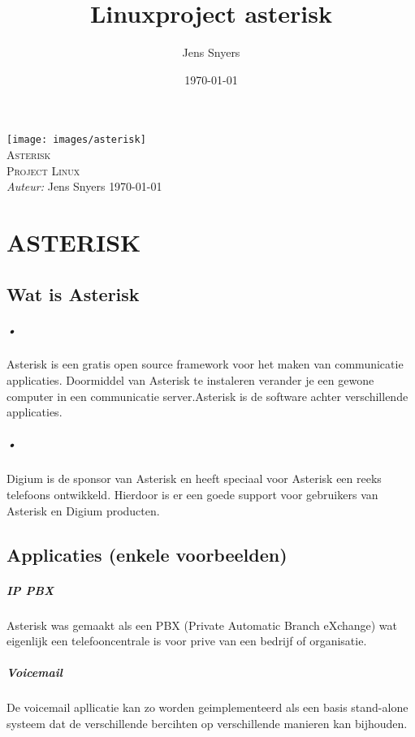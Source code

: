 \documentclass[12pt,a4paper]{report}
\title{Linuxproject asterisk}
\author{Jens Snyers}
\date{\today}
\begin{document}
\begin{titlepage}
\begin{center}
\texttt{[image: images/asterisk]} \\
\textsc{\LARGE Asterisk}\\[1.5cm]
\textsc{\Large Project Linux}\\[0.5cm]
\emph{Auteur:} Jens Snyers
\vfill
{\large \today}
\end{center}
\end{titlepage}

\tableofcontents

\chapter{ASTERISK ~\cite{ASTERISK}}
\section{Wat is Asterisk }
\paragraph{•}
Asterisk is een gratis open source framework voor het maken van communicatie applicaties. Doormiddel van Asterisk te instaleren verander je een gewone computer in een communicatie server.Asterisk is de software achter verschillende applicaties.
\paragraph{•}
Digium is de sponsor van Asterisk en heeft speciaal voor Asterisk een reeks telefoons ontwikkeld. Hierdoor is er een goede support voor gebruikers van Asterisk en Digium producten.

\section{Applicaties (enkele voorbeelden)}
\paragraph{IP PBX}
Asterisk was gemaakt als een PBX (Private Automatic Branch eXchange) wat eigenlijk een telefooncentrale is voor prive van een bedrijf of organisatie.

\paragraph{Voicemail}
De voicemail apllicatie kan zo worden geimplementeerd als een basis stand-alone systeem dat de verschillende bercihten op verschillende manieren kan bijhouden.
\end{document}
